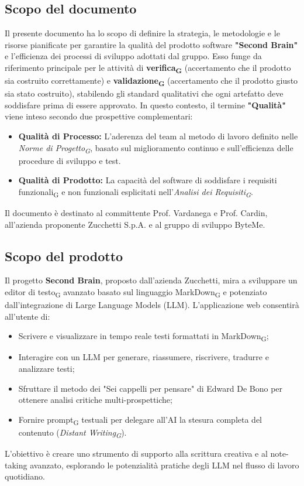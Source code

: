 \documentclass[11pt,a4paper]{article}
\newcommand{\gls}[1]{#1\textsubscript{G}}
\begin{document}
\subsection{Scopo del documento}
Il presente documento ha lo scopo di definire la strategia, le metodologie e le risorse pianificate per garantire la qualità del prodotto software \textbf{"Second Brain"} e l'efficienza dei processi di sviluppo adottati dal gruppo. Esso funge da riferimento principale per le attività di \textbf{\gls{verifica}} (accertamento che il prodotto sia costruito correttamente) e \textbf{\gls{validazione}} (accertamento che il prodotto giusto sia stato costruito), stabilendo gli standard qualitativi che ogni artefatto deve soddisfare prima di essere approvato.
In questo contesto, il termine \textbf{"Qualità"} viene inteso secondo due prospettive complementari:
\begin{itemize}
    \item \textbf{Qualità di Processo:} L'aderenza del team al metodo di lavoro definito nelle \textit{\gls{Norme di Progetto}}, basato sul miglioramento continuo e sull'efficienza delle procedure di sviluppo e test.
    \item \textbf{Qualità di Prodotto:} La capacità del software di soddisfare i \gls{requisiti funzionali} e non funzionali esplicitati nell'\textit{\gls{Analisi dei Requisiti}}.
\end{itemize}
Il documento è destinato al committente Prof. Vardanega e Prof. Cardin, all'azienda proponente Zucchetti S.p.A. e al gruppo di sviluppo ByteMe.

\subsection{Scopo del prodotto}
Il progetto \textbf{Second Brain}, proposto dall'azienda Zucchetti, mira a sviluppare un \gls{editor di testo} avanzato basato sul linguaggio \gls{MarkDown} e potenziato dall'integrazione di Large Language Models (LLM).
L'applicazione web consentirà all'utente di:
\begin{itemize}
    \item Scrivere e visualizzare in tempo reale testi formattati in \gls{MarkDown};
    \item Interagire con un LLM per generare, riassumere, riscrivere, tradurre e analizzare testi;
    \item Sfruttare il metodo dei "Sei cappelli per pensare" di Edward De Bono per ottenere analisi critiche multi-prospettiche;
    \item Fornire \gls{prompt} testuali per delegare all'AI la stesura completa del contenuto (\textit{\gls{Distant Writing}}).
\end{itemize}
L'obiettivo è creare uno strumento di supporto alla scrittura creativa e al note-taking avanzato, esplorando le potenzialità pratiche degli LLM nel flusso di lavoro quotidiano.
\end{document}
